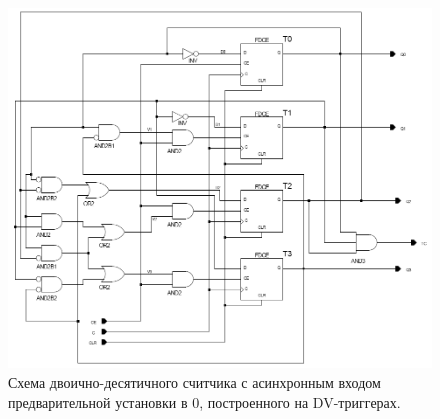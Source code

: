 \documentclass[a4paper,12pt]{article}
\begin{document}
\newpage
\begin{figure}[!htb]
	\caption{Схема двоично-десятичного считчика с асинхронным входом предварительной установки в 0, построенного на DV-триггерах.}
	\label{fig:dvcount}
	\centering
	\includegraphics[scale=0.5]{lab4dv}
\end{figure}
\end{document}
